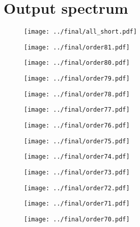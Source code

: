 \documentclass{article}
\begin{document}
\section{Output spectrum}

\begin{figure}[H]
    \centering
    \texttt{[image: ../final/all\_short.pdf]}
\end{figure}

\begin{figure}[H]
    \centering
    \texttt{[image: ../final/order81.pdf]}
\end{figure}
\begin{figure}[H]
    \centering
    \texttt{[image: ../final/order80.pdf]}
\end{figure}
\begin{figure}[H]
    \centering
    \texttt{[image: ../final/order79.pdf]}
\end{figure}
\begin{figure}[H]
    \centering
    \texttt{[image: ../final/order78.pdf]}
\end{figure}
\begin{figure}[H]
    \centering
    \texttt{[image: ../final/order77.pdf]}
\end{figure}
\begin{figure}[H]
    \centering
    \texttt{[image: ../final/order76.pdf]}
\end{figure}
\begin{figure}[H]
    \centering
    \texttt{[image: ../final/order75.pdf]}
\end{figure}
\begin{figure}[H]
    \centering
    \texttt{[image: ../final/order74.pdf]}
\end{figure}
\begin{figure}[H]
    \centering
    \texttt{[image: ../final/order73.pdf]}
\end{figure}
\begin{figure}[H]
    \centering
    \texttt{[image: ../final/order72.pdf]}
\end{figure}
\begin{figure}[H]
    \centering
    \texttt{[image: ../final/order71.pdf]}
\end{figure}
\begin{figure}[H]
    \centering
    \texttt{[image: ../final/order70.pdf]}
\end{figure}
\end{document}
